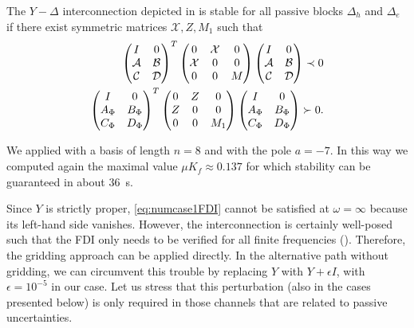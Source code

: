 \begin{coroll}\label{cor:llewellyn}
The $Y-\Delta$ interconnection depicted in  is stable for all 
passive blocks $\Delta_h$ and $\Delta_e$ if there exist symmetric matrices $\mathcal{X},
Z,M_1$ such that
\begin{align*}
\begin{pmatrix}I &0\\\mathcal{A} &\mathcal{B}\\\mathcal{C}&\mathcal{D}\end{pmatrix}^T
\begin{pmatrix}0 &\mathcal{X} &0\\ \mathcal{X}&0 &0\\0 &0 &M\end{pmatrix}
\begin{pmatrix}I &0\\\mathcal{A} &\mathcal{B}\\\mathcal{C}&\mathcal{D}\end{pmatrix} \prec 0 \\
\begin{pmatrix}I &0\\A_{\Phi} &B_{\Phi}\\C_{\Phi}&D_{\Phi}\end{pmatrix}^T
\begin{pmatrix}0 &Z &0\\Z &0 &0\\0 &0 &M_1\end{pmatrix}
\begin{pmatrix}I &0\\A_{\Phi} &B_{\Phi}\\C_{\Phi}&D_{\Phi}\end{pmatrix} \succ 0.
\end{align*}
\end{coroll}

We applied  with a basis of length $n=8$ and with the pole $a=-7$. 
In this way we computed again the maximal value $\mu K_f\approx 0.137$ for which stability 
can be guaranteed in about \SI{36}{\second}.

\begin{rem}
Since $Y$ is strictly proper,
\eqref{eq:numcase1FDI} cannot be satisfied at $\omega=\infty$ because its left-hand side vanishes. 
However, the interconnection is certainly well-posed such that the FDI only needs to be verified 
for all finite frequencies (). Therefore, the gridding approach can be applied  directly. 
In the alternative path without gridding, we can circumvent this trouble by replacing $Y$ with $Y+\epsilon 
I$, with $\epsilon=10^{-5}$ in our case. Let us stress that this perturbation (also in the cases 
presented below) is only required in those channels that are related to passive uncertainties.
\end{rem}
